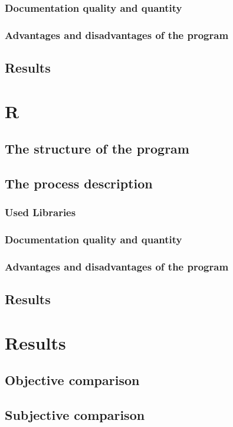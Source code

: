 \documentclass{article}
\begin{document}
\subsubsection{Documentation quality and quantity}
\subsubsection{Advantages and disadvantages of the program}
\subsection{Results}

\newpage
\section{R}
\subsection{The structure of the program}
\subsection{The process description}
\subsubsection{Used Libraries}
\subsubsection{Documentation quality and quantity}
\subsubsection{Advantages and disadvantages of the program}
\subsection{Results}

\newpage
\section{Results}
\subsection{Objective comparison}
\subsection{Subjective comparison}
\end{document}
